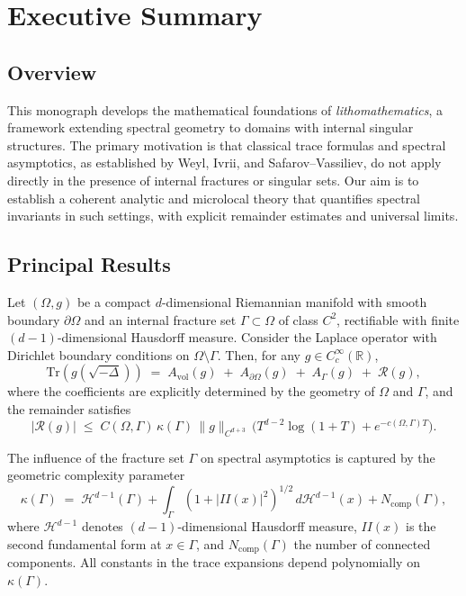 
\chapter*{Executive Summary}
\label{chap:executive-summary}

\section*{Overview}

This monograph develops the mathematical foundations of \emph{lithomathematics}, 
a framework extending spectral geometry to domains with internal singular 
structures. The primary motivation is that classical trace formulas and 
spectral asymptotics, as established by Weyl, Ivrii, and Safarov–Vassiliev, 
do not apply directly in the presence of internal fractures or singular sets. 
Our aim is to establish a coherent analytic and microlocal theory that 
quantifies spectral invariants in such settings, with explicit remainder 
estimates and universal limits.

\section*{Principal Results}

\begin{theorem}
\label{thm:main-trace}
Let $(\Omega,g)$ be a compact $d$-dimensional Riemannian manifold with 
smooth boundary $\partial\Omega$ and an internal fracture set 
$\Gamma \subset \Omega$ of class $C^2$, rectifiable with finite 
$(d-1)$-dimensional Hausdorff measure. 
Consider the Laplace operator with Dirichlet boundary conditions on 
$\Omega\setminus\Gamma$. Then, for any $g \in C^\infty_c(\mathbb{R})$,
\[
    \mathrm{Tr}(g(\sqrt{-\Delta})) \;=\;
    A_{\mathrm{vol}}(g) \;+\; A_{\partial\Omega}(g) \;+\; A_{\Gamma}(g) \;+\; \mathcal{R}(g),
\]
where the coefficients are explicitly determined by the geometry of 
$\Omega$ and $\Gamma$, and the remainder satisfies
\[
    |\mathcal{R}(g)| \;\leq\;
    C(\Omega,\Gamma)\,\kappa(\Gamma)\,\|g\|_{C^{d+3}}\,
    \Big(T^{d-2}\log(1+T) + e^{-c(\Omega,\Gamma)T}\Big).
\]
\end{theorem}

\begin{theorem}
\label{thm:complexity}
The influence of the fracture set $\Gamma$ on spectral asymptotics is 
captured by the geometric complexity parameter
\[
    \kappa(\Gamma) \;=\;
        \mathcal{H}^{d-1}(\Gamma)
        + \int_\Gamma (1+|II(x)|^2)^{1/2}\,d\mathcal{H}^{d-1}(x)
        + N_{\mathrm{comp}}(\Gamma),
\]
where $\mathcal{H}^{d-1}$ denotes $(d-1)$-dimensional Hausdorff measure, 
$II(x)$ is the second fundamental form at $x\in\Gamma$, and 
$N_{\mathrm{comp}}(\Gamma)$ the number of connected components. 
All constants in the trace expansions depend polynomially on $\kappa(\Gamma)$.
\end{theorem}

